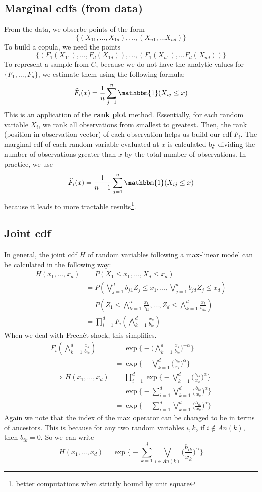 \documentclass[12pt]{article}
\theoremstyle{definition}
\theoremstyle{definition}
\begin{document}
\subsection{Marginal cdfs (from data)}
From the data, we obserbe points of the form $$\{(X_{11},\hdots,X_{1d}), \hdots, (X_{n1}, \hdots X_{nd})\}$$
To build a copula, we need the points 
$$\{(F_1(X_{11}),\hdots,F_d(X_{1d})), \hdots, (F_1(X_{n1}), \hdots F_d(X_{nd}))\}$$
To represent a sample from $C$, because we do not have the analytic values for $\{F_1,\hdots,F_d\}$, we estimate them using the following formula:
$$\widehat{F}_i(x)=\frac{1}{n}\sum_{j=1}^n\mathbbm{1}(X_{ij}\leq x)$$
This is an application of the \textbf{rank plot} method. Essentially, for each random variable $X_{i}$, we rank all observations from smallest to greatest. Then, the rank (position in observation vector) of each observation helps us build our cdf $F_i$. The marginal cdf of each random variable evaluated at $x$ is calculated by dividing the number of observations greater than $x$ by the total number of observations. In practice, we use 
$$\widehat{F}_i(x)=\frac{1}{n+1}\sum_{j=1}^n\mathbbm{1}(X_{ij}\leq x)$$
because it leads to more tractable results\footnote{better computations when strictly bound by unit square}.

\subsection{Joint cdf}
In general, the joint cdf $H$ of random variables following a max-linear model can be calculated in the following way:
\begin{align*}
    H(x_1,\hdots, x_d)&=P(X_1\leq x_1,\hdots,X_d\leq x_d)\\
    &=P(\bigvee_{j=1}^db_{j1}Z_j\leq x_1, \hdots, \bigvee_{j=1}^db_{jd}Z_j\leq x_d)\\
    &=P(Z_1\leq{\bigwedge_{k=1}^d\frac{x_k}{b_{1k}}},\hdots, Z_d\leq\bigwedge_{k=1}^d\frac{x_k}{b_{dk}})\\
    &=\prod_{i=1}^dF_i(\bigwedge_{k=1}^d\frac{x_k}{b_{ik}})
\end{align*}
When we deal with Frechét shock, this simplifies.
\begin{align*}
    F_i(\bigwedge_{k=1}^d\frac{x_k}{b_{ik}})&=\exp\bigg\{-\bigg(\bigwedge_{k=1}^d\frac{x_k}{b_{ik}}\bigg)^{-\alpha}\bigg\}\\
    &=\exp\bigg\{-\bigvee_{k=1}^d \bigg( \frac{b_{ik}}{x_k} \bigg)^\alpha\bigg\}\\
    \implies H(x_1,\hdots, x_d)&=\prod_{i=1}^d\exp\bigg\{-\bigvee_{k=1}^d \bigg( \frac{b_{ik}}{x_k} \bigg)^\alpha\bigg\}\\
    &=\exp\bigg\{ -\sum_{i=1}^d \bigvee_{k=1}^d \bigg( \frac{b_{ik}}{x_k} \bigg)^\alpha \bigg\}\\
    &=\exp\bigg\{ -\sum_{i=1}^d \bigvee_{k=1}^d \bigg( \frac{b_{ik}}{x_k} \bigg)^\alpha \bigg\}
\end{align*}
Again we note that the index of the max operator can be changed to be in terms of ancestors. This is because for any two random variables $i,k$, if $i \notin An(k)$, then $b_{ik}=0$. So we can write 
$$H(x_1,\hdots,x_d)=\exp\bigg\{ -\sum_{k=1}^d  \bigvee_{i\in An(k)}\bigg( \frac{b_{ik}}{x_k} \bigg)^\alpha \bigg\}$$
\end{document}

